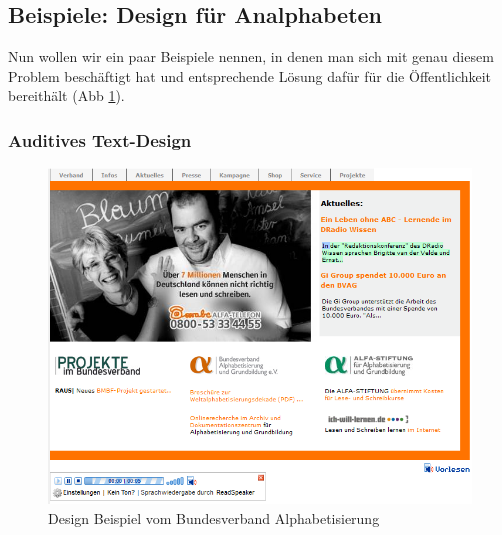 \subsection{Beispiele: Design für Analphabeten}

Nun wollen wir ein paar Beispiele nennen, in denen man sich mit genau diesem Problem beschäftigt hat und entsprechende Lösung dafür für die Öffentlichkeit bereithält (Abb \ref{fig:DesignBeispiel1}).

\subsubsection{Auditives Text-Design}

\begin{figure}[h]
	\centering
		\includegraphics[width=1.00\textwidth]{Daten/DesignBeispiel1.png}
	\caption{Design Beispiel vom Bundesverband Alphabetisierung}
	\label{fig:DesignBeispiel1}
\end{figure}


